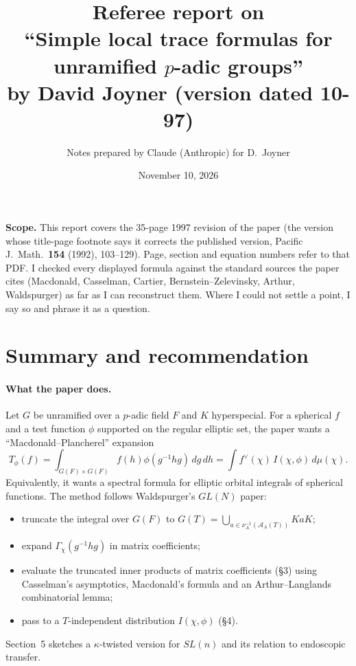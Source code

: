 \documentclass[11pt]{article}
\title{Referee report on\\ ``Simple local trace formulas for unramified $p$-adic groups''\\ by David Joyner (version dated 10-97)}
\author{Notes prepared by Claude (Anthropic) for D.~Joyner}
\date{November 10, 2026}
\newcommand{\cA}{\mathcal{A}}
\begin{document}
\maketitle

\noindent\textbf{Scope.} This report covers the 35-page 1997 revision of the paper (the version whose title-page footnote says it corrects the published version, Pacific J.\ Math.\ \textbf{154} (1992), 103--129). Page, section and equation numbers refer to that PDF. I checked every displayed formula against the standard sources the paper cites (Macdonald, Casselman, Cartier, Bernstein--Zelevinsky, Arthur, Waldspurger) as far as I can reconstruct them. Where I could not settle a point, I say so and phrase it as a question.

\tableofcontents

\section{Summary and recommendation}

\paragraph{What the paper does.} Let $G$ be unramified over a $p$-adic field $F$ and $K$ hyperspecial. For a spherical $f$ and a test function $\phi$ supported on the regular elliptic set, the paper wants a ``Macdonald--Plancherel'' expansion
\[
T_\phi(f)=\int_{G(F)\times G(F)} f(h)\phi(g^{-1}hg)\,dg\,dh=\int f^\vee(\chi)\,I(\chi,\phi)\,d\mu(\chi).
\]
Equivalently, it wants a spectral formula for elliptic orbital integrals of spherical functions. The method follows Waldspurger's $GL(N)$ paper:
\begin{itemize}
\item truncate the integral over $G(F)$ to $G(T)=\bigcup_{a\in\nu_A^{-1}(\cA_A(T))}KaK$;
\item expand $\Gamma_\chi(g^{-1}hg)$ in matrix coefficients;
\item evaluate the truncated inner products of matrix coefficients (\S3) using Casselman's asymptotics, Macdonald's formula and an Arthur--Langlands combinatorial lemma;
\item pass to a $T$-independent distribution $I(\chi,\phi)$ (\S4).
\end{itemize}
Section~5 sketches a $\kappa$-twisted version for $SL(n)$ and its relation to endoscopic transfer.
\end{document}
